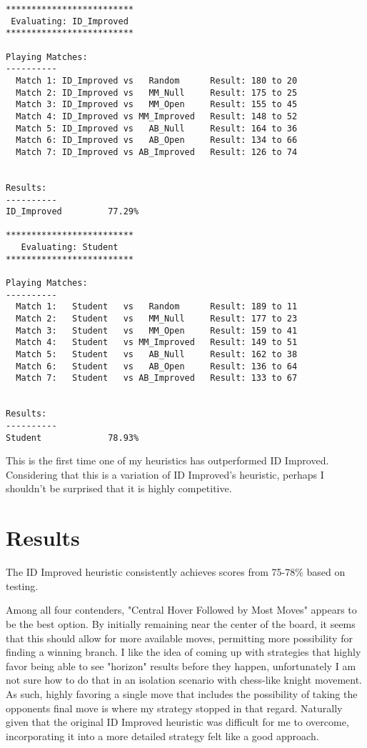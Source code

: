 \documentclass[10pt, a4paper]{article}
\begin{document}
\begin{verbatim}
*************************
 Evaluating: ID_Improved 
*************************

Playing Matches:
----------
  Match 1: ID_Improved vs   Random    	Result: 180 to 20
  Match 2: ID_Improved vs   MM_Null   	Result: 175 to 25
  Match 3: ID_Improved vs   MM_Open   	Result: 155 to 45
  Match 4: ID_Improved vs MM_Improved 	Result: 148 to 52
  Match 5: ID_Improved vs   AB_Null   	Result: 164 to 36
  Match 6: ID_Improved vs   AB_Open   	Result: 134 to 66
  Match 7: ID_Improved vs AB_Improved 	Result: 126 to 74


Results:
----------
ID_Improved         77.29%

*************************
   Evaluating: Student   
*************************

Playing Matches:
----------
  Match 1:   Student   vs   Random    	Result: 189 to 11
  Match 2:   Student   vs   MM_Null   	Result: 177 to 23
  Match 3:   Student   vs   MM_Open   	Result: 159 to 41
  Match 4:   Student   vs MM_Improved 	Result: 149 to 51
  Match 5:   Student   vs   AB_Null   	Result: 162 to 38
  Match 6:   Student   vs   AB_Open   	Result: 136 to 64
  Match 7:   Student   vs AB_Improved 	Result: 133 to 67


Results:
----------
Student             78.93%
\end{verbatim}

This is the first time one of my heuristics has outperformed ID Improved.  Considering that this
is a variation of ID Improved's heuristic, perhaps I shouldn't be surprised that it is highly competitive.

\section{Results}

The ID Improved heuristic consistently achieves scores from 75-78\% based on testing.

Among all four contenders, "Central Hover Followed by Most Moves" appears to be the best option.
By initially remaining near the center of the board, it seems
that this should allow for more available moves, permitting more possibility for finding a winning branch.
I like the idea of coming up with strategies that highly favor being able to see "horizon" results 
before they happen, unfortunately I am not sure how to do that in an isolation scenario with chess-like knight movement.
As such, highly favoring a single move that includes the possibility of taking the opponents final move
is where my strategy stopped in that regard.  Naturally given that the original ID Improved heuristic
was difficult for me to overcome, incorporating it into a more detailed strategy felt like a good approach.
\end{document}
